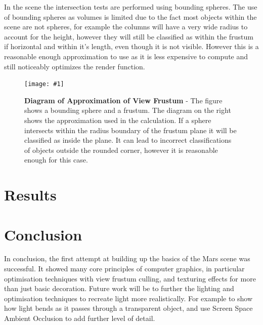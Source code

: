 \documentclass[conference]{acmsiggraph}
\newcommand{\figuremacroW}[4]{
	\begin{figure}[h] %
		\centering
		\texttt{[image: \#1]}
		\caption[#2]{\textbf{#2} - #3}
		\label{fig:#1}
	\end{figure}
}
\begin{document}
In the scene the intersection tests are performed using bounding spheres. The use of bounding spheres as volumes is limited due to the fact most objects within the scene are not spheres, for example the columns will have a very wide radius to account for the height, however they will still be classified as within the frustum if horizontal and within it's length, even though it is not visible. However this is a reasonable enough approximation to use as it is less expensive to compute and still noticeably optimizes the render function.

\figuremacroW
{approxFrustum}
{Diagram of Approximation of View Frustum}
{The figure shows a bounding sphere and a frustum. The diagram on the right shows the approximation used in the calculation. If a sphere intersects within the radius boundary of the frustum plane it will be classified as inside the plane. It can lead to incorrect classifications of objects outside the rounded corner, however it is reasonable enough for this case. \cite{RTR}}
{1.0}


\section{Results}

\section{Conclusion}
In conclusion, the first attempt at building up the basics of the Mars scene was successful. It showed many core principles of computer graphics, in particular optimisation techniques with view frustum culling, and texturing effects for more than just basic decoration. Future work will be to further the lighting and optimisation techniques to recreate light more realistically. For example to show how light bends as it passes through a transparent object, and use Screen Space Ambient Occlusion to add further level of detail.


\end{document}
